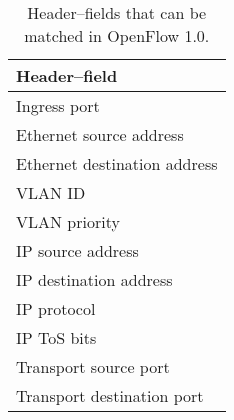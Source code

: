 \begin{table}
  \centering
  \begin{tabular}{l}
    \hline
     \textbf{Header--field} \\
    \hline
     Ingress port \\

     Ethernet source address \\
     Ethernet destination address \\

     VLAN ID \\
     VLAN priority \\

     IP source address \\
     IP destination address \\
     IP protocol \\
     IP \ac{ToS} bits \\

     Transport source port \\
     Transport destination port \\
    \hline
  \end{tabular}
  \caption{Header--fields that can be matched in OpenFlow 1.0.}
  \label{table:openflow-1.0.headers}
\end{table}

